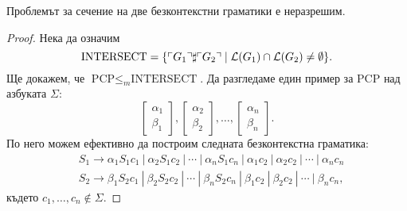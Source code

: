 \begin{corollary}
  Проблемът за сечение на две безконтекстни граматики е неразрешим.
\end{corollary}
\begin{proof}
  Нека да означим
  \[\text{INTERSECT} = \{\ulcorner{G_1}\urcorner\sharp\ulcorner{G_2}\urcorner \mid \mathcal{L}(G_1) \cap \mathcal{L}(G_2) \neq \emptyset \}.\]
  Ще докажем, че $\text{PCP} \leq_m \text{INTERSECT}$.
  Да разгледаме един пример за $\text{PCP}$ над азбуката $\Sigma$:
  \[\begin{bmatrix} \alpha_1\\ \beta_1\end{bmatrix},\begin{bmatrix} \alpha_2\\ \beta_2\end{bmatrix},\dots,\begin{bmatrix} \alpha_n\\ \beta_n\end{bmatrix}.\]
  По него можем ефективно да построим следната безконтекстна граматика:
  \begin{align*}
    & S_1 \to \alpha_1S_1 c_1\ |\ \alpha_2 S_1 c_2\ |\ \cdots\ |\ \alpha_n S_1 c_n\ |\ \alpha_1c_2\ |\ \alpha_2c_2\ |\ \cdots\ |\ \alpha_nc_n\\
    & S_2 \to \beta_1S_2 c_1\ |\ \beta_2 S_2 c_2\ |\ \cdots\ |\ \beta_n S_2 c_n\ |\ \beta_1c_2\ |\ \beta_2c_2\ |\ \cdots\ |\ \beta_nc_n,
  \end{align*}
  където $c_1,\dots,c_n \not \in \Sigma$.
\end{proof}




